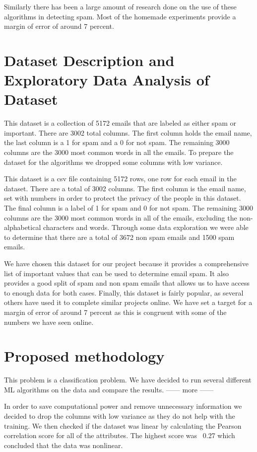 \documentclass[10pt]{article}
\begin{document}
Similarly there has been a large amount of research done on the use of these algorithms in detecting spam. Most of the homemade experiments provide a margin of error of around 7 percent. 

\section{Dataset Description and Exploratory Data Analysis of Dataset}

This dataset is a collection of 5172 emails that are labeled as either spam or important. There are 3002 total columns. The first column holds the email name, the last column is a 1 for spam and a 0 for not spam. The remaining 3000 columns are the 3000 most common words in all the emails.
To prepare the dataset for the algorithms we dropped some columns with low variance. 

This dataset is a csv file containing 5172 rows, one row for each email in the dataset. There are a total of 3002 columns. The first column is the email name, set with numbers in order to protect the privacy of the people in this dataset. The final column is a label of 1 for spam and 0 for not spam. The remaining 3000 columns are the 3000 most common words in all of the emails, excluding the non-alphabetical characters and words. Through some data exploration we were able to determine that there are a total of 3672 non spam emails and 1500 spam emails. 

We have chosen this dataset for our project because it provides a comprehensive list of important values that can be used to determine email spam. It also provides a good split of spam and non spam emails that allows us to have access to enough data for both cases. Finally, this dataset is fairly popular, as several others have used it to complete similar projects online. We have set a target for a margin of error of around 7 percent as this is congruent with some of the numbers we have seen online.  

\newpage
\section{Proposed methodology}

This problem is a classification problem. We have decided to run several different ML algorithms on the data and compare the results. ------ more ------

In order to save computational power and remove unnecessary information we decided to drop the columns with low variance as they do not help with the training. We then checked if the dataset was linear by calculating the Pearson correlation score for all of the attributes. The highest score was ~0.27 which concluded that the data was nonlinear.
\end{document}
